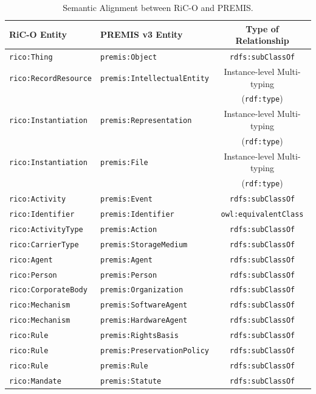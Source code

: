 \documentclass[runningheads]{llncs}
\begin{document}
\begin{table}[ht]
	\begin{center}
		\scriptsize
		\begin{tabular}{l  l  c}
			\hline\hline
			\textbf{RiC-O Entity} & \textbf{PREMIS v3 Entity} & \textbf{Type of Relationship} \\
			\hline\hline
			\texttt{rico:Thing} & 	\texttt{premis:Object} & 	\texttt{rdfs:subClassOf} \\\hline
			\texttt{rico:RecordResource} & \texttt{premis:IntellectualEntity} & Instance-level Multi-typing\\
			&  & (\texttt{rdf:type}) \\
			\hline
			\texttt{rico:Instantiation} & \texttt{premis:Representation} & Instance-level Multi-typing\\
			&  & (\texttt{rdf:type}) \\\hline
			\texttt{rico:Instantiation} & \texttt{premis:File} & Instance-level Multi-typing\\
			&  & (\texttt{rdf:type}) \\\hline
			\texttt{rico:Activity} & \texttt{premis:Event} & \texttt{rdfs:subClassOf} \\\hline
			\texttt{rico:Identifier} & \texttt{premis:Identifier} & \texttt{owl:equivalentClass} \\\hline
			\texttt{rico:ActivityType} & \texttt{premis:Action} & \texttt{rdfs:subClassOf} \\\hline
			\texttt{rico:CarrierType} & \texttt{premis:StorageMedium} & \texttt{rdfs:subClassOf} \\\hline
			\texttt{rico:Agent} & \texttt{premis:Agent} & \texttt{rdfs:subClassOf} \\\hline
			\texttt{rico:Person} & \texttt{premis:Person} & \texttt{rdfs:subClassOf} \\\hline
			\texttt{rico:CorporateBody} & \texttt{premis:Organization} & \texttt{rdfs:subClassOf} \\\hline
			\texttt{rico:Mechanism} & \texttt{premis:SoftwareAgent} & \texttt{rdfs:subClassOf} \\\hline
			\texttt{rico:Mechanism} & \texttt{premis:HardwareAgent} & \texttt{rdfs:subClassOf} \\\hline
			\texttt{rico:Rule} & \texttt{premis:RightsBasis} & \texttt{rdfs:subClassOf} \\\hline
			\texttt{rico:Rule} & \texttt{premis:PreservationPolicy} & \texttt{rdfs:subClassOf} \\\hline
			\texttt{rico:Rule} & \texttt{premis:Rule} & \texttt{rdfs:subClassOf} \\\hline
			\texttt{rico:Mandate} & \texttt{premis:Statute} & \texttt{rdfs:subClassOf} \\\hline
			\hline
		\end{tabular}
	\end{center}
	\caption{Semantic Alignment between RiC-O and PREMIS.}
	\label{tab:rico-premis-mapping}
\end{table}
\end{document}
